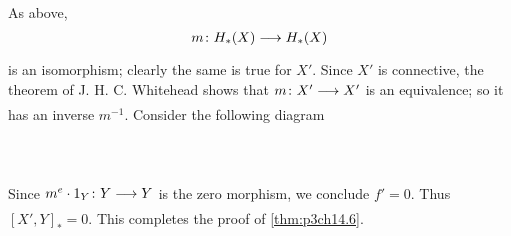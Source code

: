 \documentclass[../main]{subfiles}
\begin{document}
As above, 
\[
  m\colon  H_{\ast}(X)  \lar{}  H_{\ast}(X)  
\] 
is an isomorphism; clearly the same is true for $X'$. Since $X'$ is connective, the theorem of J. H. C. Whitehead shows that $m\colon  X' \lar{}  X' $ is an equivalence; so it has an inverse $m^{-1}$. Consider the following diagram 
~\\~\\
~\\~\\
Since $m^{e}\cdot 1_{Y}\colon Y \lar{} Y$ is the zero morphism, we conclude $f'=0.$ Thus $\left[X',Y\right]_{\ast}=0$. This completes the proof of \ref{thm:p3ch14.6}.
\end{document}
